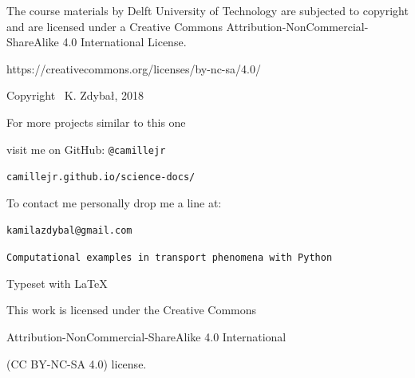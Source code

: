 \documentclass[10pt]{article}
\begin{document}
The course materials by Delft University of Technology are subjected to copyright and are licensed under a Creative Commons Attribution-NonCommercial-ShareAlike 4.0 International License.

https://creativecommons.org/licenses/by-nc-sa/4.0/

\begin{center}
\vspace*{7cm}

\setlength{\parskip}{0.0em}
\setlength{\parindent}{0cm}

Copyright \textcopyright \, K. Zdybał, 2018

For more projects similar to this one

visit me on GitHub: \verb|@camillejr|

\verb|camillejr.github.io/science-docs/|

To contact me personally drop me a line at:

\verb|kamilazdybal@gmail.com|

\vspace*{2cm}

\verb|Computational examples in transport phenomena with Python|

Typeset with \LaTeX

\vspace*{1.8cm}

\noindent This work is licensed under the Creative Commons

Attribution-NonCommercial-ShareAlike 4.0 International 

(CC BY-NC-SA
4.0) license.
\end{center}
\end{document}
